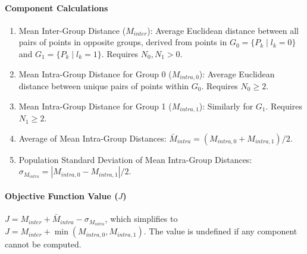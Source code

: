 \documentclass[conference]{IEEEtran} %
\begin{document}
\paragraph{Component Calculations}
\begin{enumerate}
    \item Mean Inter-Group Distance ($M_{inter}$): Average Euclidean distance between all pairs of points in opposite groups, derived from points in $G_0 = \{P_k \mid l_k=0\}$ and $G_1 = \{P_k \mid l_k=1\}$. Requires $N_0, N_1 > 0$.
    \item Mean Intra-Group Distance for Group 0 ($M_{intra,0}$): Average Euclidean distance between unique pairs of points within $G_0$. Requires $N_0 \ge 2$.
    \item Mean Intra-Group Distance for Group 1 ($M_{intra,1}$): Similarly for $G_1$. Requires $N_1 \ge 2$.
    \item Average of Mean Intra-Group Distances: $\bar{M}_{intra} = (M_{intra,0} + M_{intra,1})/2$.
    \item Population Standard Deviation of Mean Intra-Group Distances: $\sigma_{M_{intra}} = |M_{intra,0} - M_{intra,1}|/2$.
\end{enumerate}
\paragraph{Objective Function Value ($J$)}
$J = M_{inter} + \bar{M}_{intra} - \sigma_{M_{intra}}$, which simplifies to $J = M_{inter} + \min(M_{intra,0}, M_{intra,1})$. The value is undefined if any component cannot be computed.
\end{document}
